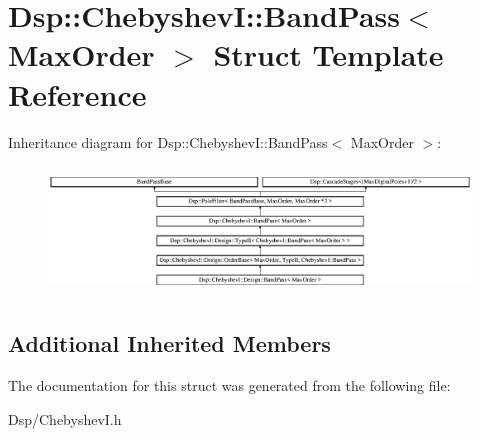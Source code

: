 \hypertarget{structDsp_1_1ChebyshevI_1_1BandPass}{\section{Dsp\-:\-:Chebyshev\-I\-:\-:Band\-Pass$<$ Max\-Order $>$ Struct Template Reference}
\label{structDsp_1_1ChebyshevI_1_1BandPass}
}
Inheritance diagram for Dsp\-:\-:Chebyshev\-I\-:\-:Band\-Pass$<$ Max\-Order $>$\-:\begin{figure}[H]
\begin{center}
\leavevmode
\includegraphics[height=3.421589cm]{structDsp_1_1ChebyshevI_1_1BandPass}
\end{center}
\end{figure}
\subsection*{Additional Inherited Members}


The documentation for this struct was generated from the following file\-:\begin{DoxyCompactItemize}
\item 
Dsp/Chebyshev\-I.\-h\end{DoxyCompactItemize}
